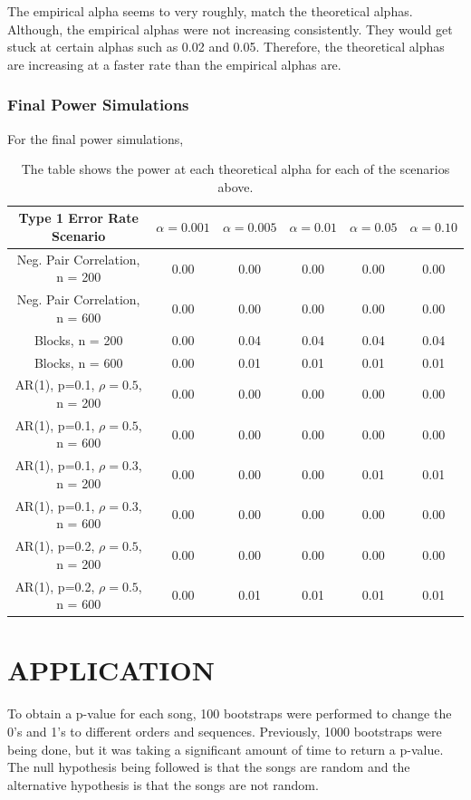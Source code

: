 \documentclass[12pt, letterpaper]{article}
\begin{document}
The empirical alpha seems to very roughly, match the theoretical alphas. Although, the empirical alphas were not increasing consistently. They would get stuck at certain alphas such as 0.02 and 0.05. Therefore, the theoretical alphas are increasing at a faster rate than the empirical alphas are.

\subsubsection{Final Power Simulations}
For the final power simulations, 
\begin{table}[t]
\begin{center}
\begin{tabular}{|c|c|c|c|c|c|}
\hline
\textbf{Type 1 Error Rate Scenario} & $\alpha = 0.001$ &  $\alpha = 0.005$ &  $\alpha = 0.01$ &  $\alpha = 0.05$ &  $\alpha = 0.10$ \\
\hline
Neg. Pair Correlation, n = 200 & 0.00 & 0.00 & 0.00 & 0.00 & 0.00 \\
\hline
Neg. Pair Correlation, n = 600 & 0.00 & 0.00 & 0.00 & 0.00 & 0.00 \\
\hline
Blocks, n = 200 & 0.00 & 0.04 & 0.04 & 0.04 & 0.04 \\
\hline
Blocks, n = 600 & 0.00 & 0.01 & 0.01 & 0.01 & 0.01 \\
\hline
AR(1), p=0.1, $\rho = 0.5$, n = 200 & 0.00 & 0.00 & 0.00 & 0.00 & 0.00 \\
\hline
AR(1), p=0.1, $\rho = 0.5$, n = 600 & 0.00 & 0.00 & 0.00 & 0.00 & 0.00 \\
\hline
AR(1), p=0.1, $\rho = 0.3$, n = 200 & 0.00 & 0.00 & 0.00 & 0.01 & 0.01 \\
\hline
AR(1), p=0.1, $\rho = 0.3$, n = 600 & 0.00 & 0.00 & 0.00 & 0.00 & 0.00 \\
\hline
AR(1), p=0.2, $\rho = 0.5$, n = 200 & 0.00 & 0.00 & 0.00 & 0.00 & 0.00 \\
\hline
AR(1), p=0.2, $\rho = 0.5$, n = 600 & 0.00 & 0.01 & 0.01 & 0.01 & 0.01 \\
\hline
\end{tabular}
\end{center}
\caption{The table shows the power at each theoretical alpha for each of the scenarios above.}
\label{fig: Power Simulations using Nonparametric Bootstrap}
\end{table}



\section{APPLICATION}
To obtain a p-value for each song, 100 bootstraps were performed to change the 0's and 1's to different orders and sequences.  Previously, 1000 bootstraps were being done, but it was taking a significant amount of time to return a p-value.  The null hypothesis being followed is that the songs are random and the alternative hypothesis is that the songs are not random. 
\end{document}
